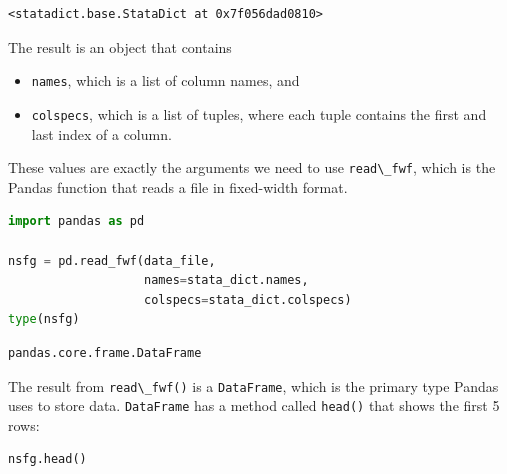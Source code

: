 \begin{lstlisting}[style=output]
<statadict.base.StataDict at 0x7f056dad0810>
\end{lstlisting}

The result is an object that contains

\begin{itemize}
\item
  \passthrough{\lstinline!names!}, which is a list of column names, and
\item
  \passthrough{\lstinline!colspecs!}, which is a list of tuples, where
  each tuple contains the first and last index of a column.
\end{itemize}

These values are exactly the arguments we need to use
\passthrough{\lstinline!read\_fwf!}, which is the Pandas function that
reads a file in fixed-width format.

\begin{lstlisting}[language=Python,style=source]
import pandas as pd

nsfg = pd.read_fwf(data_file, 
                   names=stata_dict.names, 
                   colspecs=stata_dict.colspecs)
type(nsfg)
\end{lstlisting}

\begin{lstlisting}[style=output]
pandas.core.frame.DataFrame
\end{lstlisting}

The result from \passthrough{\lstinline!read\_fwf()!} is a
\passthrough{\lstinline!DataFrame!}, which is the primary type Pandas
uses to store data. \passthrough{\lstinline!DataFrame!} has a method
called \passthrough{\lstinline!head()!} that shows the first 5 rows:

\begin{lstlisting}[language=Python,style=source]
nsfg.head()
\end{lstlisting}

